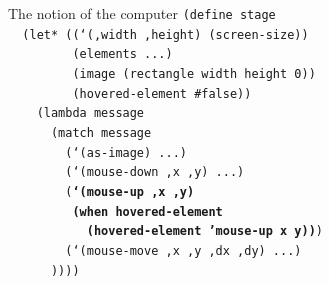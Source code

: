 \documentclass{beamer}
\begin{document}
\begin{frame}{The notion of the computer}
  \scriptsize
  \texttt{(define stage\\
    \ \ (let* ((`(,width ,height) (screen-size))\\
    \ \ \ \ \ \ \ \ \ (elements ...)\\
    \ \ \ \ \ \ \ \ \ (image (rectangle width height 0))\\
    \ \ \ \ \ \ \ \ \ (hovered-element \#false))\\
    \ \ \ \ (lambda message\\
    \ \ \ \ \ \ (match message\\
    \ \ \ \ \ \ \ \ (`(as-image) ...)\\
    \ \ \ \ \ \ \ \ (`(mouse-down ,x ,y) ...)\\
    \ \ \ \ \ \ \ \ (\textbf{`(mouse-up ,x ,y) \\
    \ \ \ \ \ \ \ \ \ (when hovered-element\\
    \ \ \ \ \ \ \ \ \ \ \ (hovered-element 'mouse-up x y))})\\
    \ \ \ \ \ \ \ \ (`(mouse-move ,x ,y ,dx ,dy) ...)\\
    \ \ \ \ \ \ ))))\\
    \ \\
    \ \\
    \ \\
    \ \\
    \ \\
    \ \\
    \ \\
    \ \\
    \ \\
    \ \\
    \ 
}
\end{frame}
\end{document}
